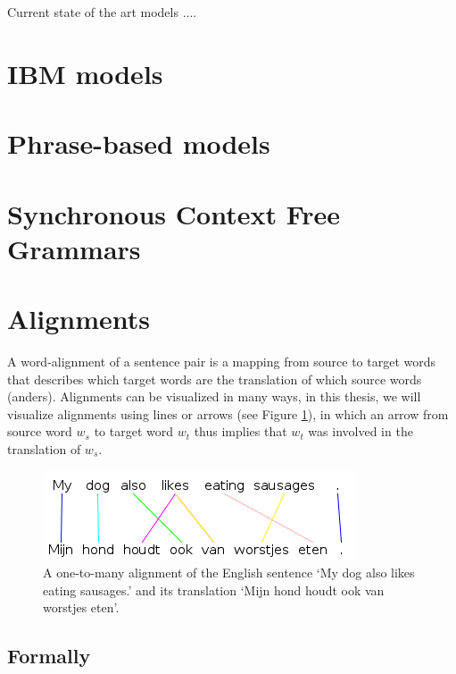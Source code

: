 \documentclass{report}
\theoremstyle{definition}
\theoremstyle{plain}
\begin{document}
Current state of the art models ....

\newpage

\section{IBM models}
\label{sec:IBM}



\section{Phrase-based models}
\label{sec:pbmodels}

\section{Synchronous Context Free Grammars}
\label{sec:SCFGs}
 
 
\newpage
 
\section{Alignments}
\label{sec:alignments}

A word-alignment of a sentence pair is a mapping from source to target words that describes which target words are the translation of which source words (anders). Alignments can be visualized in many ways, in this thesis, we will visualize alignments using lines or arrows (see Figure \ref{fig:alignment}), in which an arrow from source word $w_s$ to target word $w_t$ thus implies that $w_t$ was involved in the translation of $w_s$.


\begin{figure}[!ht]
\centering
\includegraphics[scale=0.6]{alignment.png}
\caption{A one-to-many alignment of the English sentence `My dog also likes eating sausages.' and its translation `Mijn hond houdt ook van worstjes eten'.%
\cite{maillette2010visualizing}
}\label{fig:alignment}
\end{figure}


\subsection{Formally}
\end{document}
